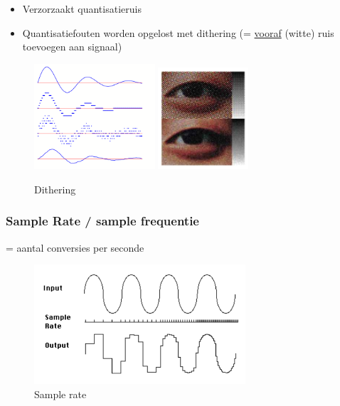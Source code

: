 \documentclass{article}
\begin{document}
\begin{itemize}
    \item Verzorzaakt quantisatieruis
    \item Quantisatiefouten worden opgelost met dithering (= \underline{vooraf} (witte) ruis toevoegen aan signaal)
\end{itemize}

\begin{figure}[H]
    \centering
    \centerline{
        \includegraphics[width=0.4\textwidth]{Screenshot_20200224_121151.png}
        \includegraphics[width=0.3\textwidth]{Screenshot_20200315_122540.png}
    }
    \caption{Dithering}
\end{figure}

\subsubsection{Sample Rate / sample frequentie}
= aantal conversies per seconde
\begin{figure}[H]
    \centering
    \includegraphics[width=0.7\textwidth]{Screenshot_20200224_121653.png}
    \caption{Sample rate}
\end{figure}
\end{document}

